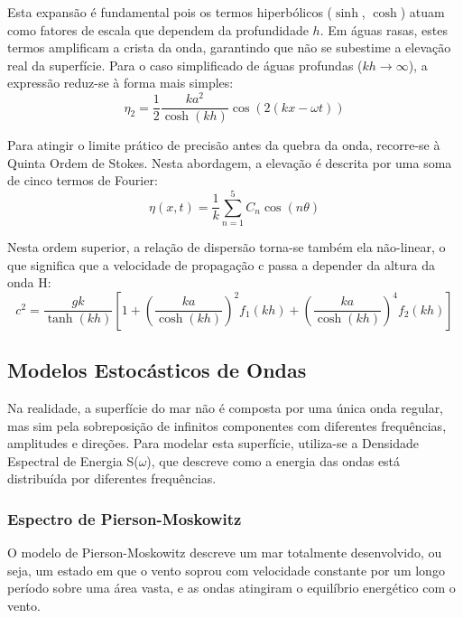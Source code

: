 \documentclass[11pt,a4paper]{article}
\begin{document}
Esta expansão é fundamental pois os termos hiperbólicos ($\sinh$, $\cosh$) atuam como fatores de escala que dependem da profundidade $h$. Em águas rasas, estes termos amplificam a crista da onda, garantindo que não se subestime a elevação real da superfície. Para o caso simplificado de águas profundas ($kh \to \infty$), a expressão reduz-se à forma mais simples:
\begin{equation*}
     \eta_2 = \frac{1}{2} \frac{k a^2}{\cosh(kh)} \cos(2(kx - \omega t))
\end{equation*}

Para atingir o limite prático de precisão antes da quebra da onda, recorre-se à Quinta Ordem de Stokes. Nesta abordagem, a elevação é descrita por uma soma de cinco termos de Fourier:
\begin{equation*}
     \eta(x,t) = \frac{1}{k} \sum_{n=1}^{5} C_n \cos(n\theta)
\end{equation*}

Nesta ordem superior, a relação de dispersão torna-se também ela não-linear, o que significa que a velocidade de propagação c passa a depender da altura da onda H:
\begin{equation*}
     c^2 = \frac{g k}{\tanh(kh)} [1 + (\frac{k a}{\cosh(kh)})^2 f_1(kh) + (\frac{k a}{\cosh(kh)})^4 f_2(kh)]
\end{equation*}

\subsection{Modelos Estocásticos de Ondas}

Na realidade, a superfície do mar não é composta por uma única onda regular, mas sim pela sobreposição de infinitos componentes com diferentes frequências, amplitudes e direções. Para modelar esta superfície, utiliza-se a Densidade Espectral de Energia S($\omega$), que descreve como a energia das ondas está distribuída por diferentes frequências.

\subsubsection{Espectro de Pierson-Moskowitz}

O modelo de Pierson-Moskowitz \parencite{pierson1964frequency} descreve um mar totalmente desenvolvido, ou seja, um estado em que o vento soprou com velocidade constante por um longo período sobre uma área vasta, e as ondas atingiram o equilíbrio energético com o vento.
\end{document}
